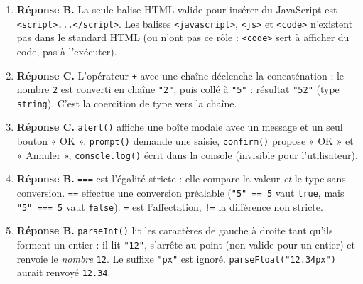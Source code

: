 \documentclass[11pt]{article}
\newcommand{\cle}[1]{{\popxbold\color{popdark}#1}}
\begin{document}
\begin{corrige}
\begin{enumerate}
    \item \textbf{Réponse B.} La seule balise HTML valide pour insérer du JavaScript est \texttt{<script>...</script>}. Les balises \texttt{<javascript>}, \texttt{<js>} et \texttt{<code>} n'existent pas dans le standard HTML (ou n'ont pas ce rôle : \texttt{<code>} sert à afficher du code, pas à l'exécuter).
    \item \textbf{Réponse C.} L'opérateur \texttt{+} avec une chaîne déclenche la \cle{concaténation} : le nombre \texttt{2} est converti en chaîne \texttt{"2"}, puis collé à \texttt{"5"} : résultat \texttt{"52"} (type \texttt{string}). C'est la coercition de type vers la chaîne.
    \item \textbf{Réponse C.} \texttt{alert()} affiche une boîte modale avec un message et un seul bouton « OK ». \texttt{prompt()} demande une saisie, \texttt{confirm()} propose « OK » et « Annuler », \texttt{console.log()} écrit dans la console (invisible pour l'utilisateur).
    \item \textbf{Réponse B.} \texttt{===} est l'égalité \cle{stricte} : elle compare la valeur \emph{et} le type sans conversion. \texttt{==} effectue une conversion préalable (\texttt{"5" == 5} vaut \texttt{true}, mais \texttt{"5" === 5} vaut \texttt{false}). \texttt{=} est l'affectation, \texttt{!=} la différence non stricte.
    \item \textbf{Réponse B.} \texttt{parseInt()} lit les caractères de gauche à droite tant qu'ils forment un entier : il lit \texttt{"12"}, s'arrête au point (non valide pour un entier) et renvoie le \emph{nombre} \texttt{12}. Le suffixe \texttt{"px"} est ignoré. \texttt{parseFloat("12.34px")} aurait renvoyé \texttt{12.34}.
\end{enumerate}
\end{corrige}
\end{document}
